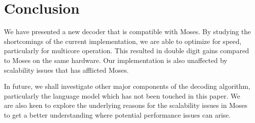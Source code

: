 \documentclass[]{article}
\begin{document}
\section{Conclusion}

We have presented a new decoder that is compatible with Moses. By studying the shortcomings of the current implementation, we are able to optimize for speed, particularly for multicore operation. This resulted in double digit gains compared to Moses on the same hardware. Our implementation is also unaffected by scalability issues that has afflicted Moses. %

In future, we shall investigate other major components of the decoding algorithm, particularly the language model which has not been touched in this paper. We are also keen to explore the underlying reasons for the scalability issues in Moses to get a better understanding where potential performance issues can arise. 


% 

\small



\end{document}
